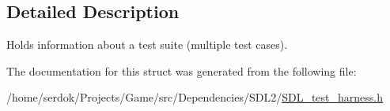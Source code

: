 \subsection{Detailed Description}
Holds information about a test suite (multiple test cases). 

The documentation for this struct was generated from the following file\+:\begin{DoxyCompactItemize}
\item 
/home/serdok/\+Projects/\+Game/src/\+Dependencies/\+S\+D\+L2/\hyperlink{SDL__test__harness_8h}{S\+D\+L\+\_\+test\+\_\+harness.\+h}\end{DoxyCompactItemize}
